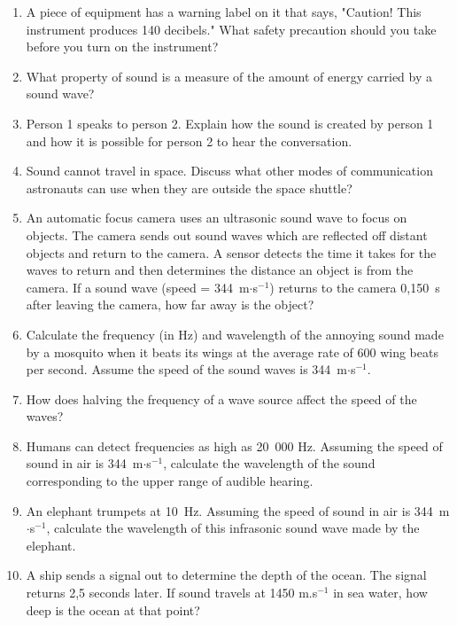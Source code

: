 \begin{enumerate}[noitemsep, label=\textbf{\arabic*}. ]
\label{m38800*uid93}\item A piece of equipment has a warning label on it that says, "Caution! This instrument produces 140 decibels." What safety precaution should you take before you turn on the instrument?\newline
\label{m38800*uid94}\item What property of sound is a measure of the amount of energy carried by a sound wave?\newline
\label{m38800*uid96}\item Person 1 speaks to person 2. Explain how the sound is created by person 1 and how it is possible for person 2 to hear the conversation.\newline
\label{m38800*uid97}\item Sound cannot travel in space. Discuss what other modes of communication astronauts can use when they are outside the space shuttle?\newline
\label{m38800*uid98}\item An automatic focus camera uses an ultrasonic sound wave to focus on objects. The camera sends out sound waves which are reflected off distant objects and return to the camera. A sensor detects the time it takes for the waves to return and then determines the distance an object is from the camera. If a sound wave (speed = 344~m$\ensuremath{\cdot}$s${}^{-1}$) returns to the camera 0,150~s after leaving the camera, how far away is the object?\newline
\label{m38800*uid99}\item Calculate the frequency (in Hz) and wavelength of the annoying sound made by a mosquito when it beats its wings at the average rate of 600 wing beats per second. Assume the speed of the sound waves is 344~m$\ensuremath{\cdot}$s${}^{-1}$.        
\label{m38800*uid100}\item How does halving the frequency of a wave source affect the speed of the waves?\newline
\label{m38800*uid101}\item Humans can detect frequencies as high as 20~000 Hz. Assuming the speed of sound in air is 344~m$\ensuremath{\cdot}$s${}^{-1}$, calculate the wavelength of the sound corresponding to the upper range of audible hearing.\newline
\label{m38800*uid102}\item An elephant trumpets at 10~Hz. Assuming the speed of sound in air is 344~m$\ensuremath{\cdot}$s${}^{-1}$, calculate the wavelength of this infrasonic sound wave made by the elephant.\newline
\label{m38800*uid103}\item A ship sends a signal out to determine the depth of the ocean. The signal returns 2,5 seconds later. If sound travels at
1450 m.s${}^{-1}$ in sea water, how deep is the ocean at that point?\newline
\end{enumerate}
